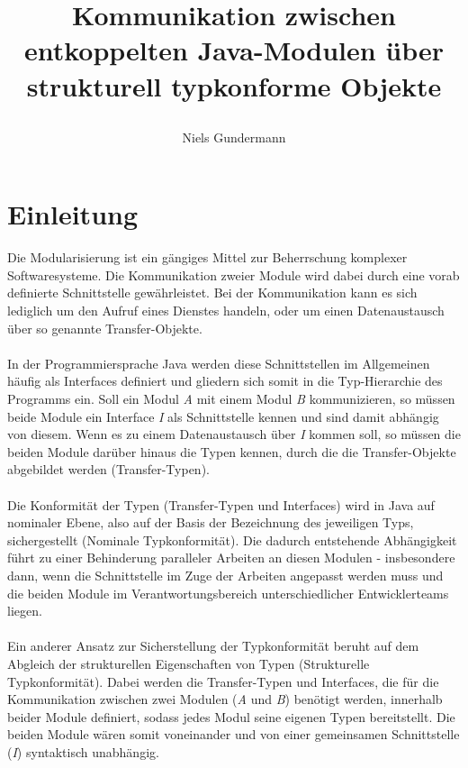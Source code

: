 \documentclass[11pt, 
ngerman,
doublespacing,
chapterinoneline, %
consistentlayout, %
]{scrartcl}
\begin{document}
\author{Niels Gundermann}
\title{Kommunikation zwischen entkoppelten Java-Modulen über strukturell typkonforme Objekte

}
\maketitle
\section{Einleitung}
Die Modularisierung ist ein gängiges Mittel zur Beherrschung komplexer Softwaresys\-teme. Die Kommunikation zweier Module wird dabei durch eine vorab definierte Schnitt\-stelle gewährleistet. Bei der Kommunikation kann es sich lediglich um den Aufruf eines Dienstes handeln, oder um einen Datenaus\-tausch über so genannte Transfer-Objekte.\\\\
In der Programmiersprache Java wer\-den diese Schnittstellen im Allgemeinen häufig als Interfaces definiert und gliedern sich somit in die Typ-Hierarchie des Programms ein. Soll ein Modul \emph{A} mit einem Modul \emph{B}  kommunizieren, so müssen beide Module ein Interface \emph{I} als Schnittstelle kennen und sind damit abhängig von diesem. Wenn es zu einem Datenaustausch über \emph{I} kommen soll, so müssen die beiden Module darüber hinaus die Typen kennen, durch die die Transfer-Objekte abgebildet werden (Transfer-Typen).\\\\
Die Konformität der Typen (Transfer-Typen und Interfaces) wird in Java auf nominaler Ebene, also auf der Basis der Bezeichnung des jeweiligen Typs, sichergestellt (Nominale Typkonformität).
Die dadurch entstehende Abhängigkeit führt zu einer Behinderung paralleler Arbeiten an diesen Modulen - insbesondere dann, wenn die Schnitt\-stelle im Zuge der Arbeiten angepasst werden muss und die beiden Module im Verantwor\-tungs\-bereich unterschiedlicher Entwicklerteams liegen.\\\\ 
Ein anderer Ansatz zur Sicherstellung der Typkonformität beruht auf dem Abgleich der strukturellen Eigenschaften von Typen (Strukturelle Typkonformität). Dabei werden die Transfer-Typen und Interfaces, die für die Kommunikation zwischen zwei Modulen (\emph{A} und \emph{B}) benötigt werden, innerhalb beider Module definiert, sodass jedes Modul seine eigenen Typen bereitstellt. Die beiden Module wären somit voneinander und von einer gemeinsamen Schnitt\-stelle (\emph{I}) syntaktisch unabhängig.
\end{document}
